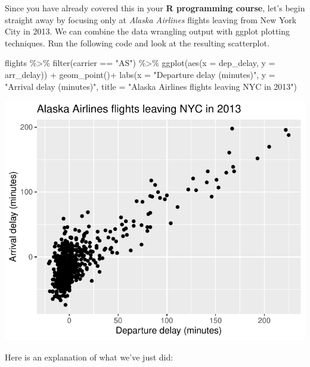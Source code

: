 \documentclass[
  letterpaper,
  DIV=11,
  numbers=noendperiod]{scrartcl}
\newenvironment{Shaded}{\begin{snugshade}}{\end{snugshade}}
\newcommand{\AttributeTok}[1]{\textcolor[rgb]{0.40,0.45,0.13}{#1}}
\newcommand{\FunctionTok}[1]{\textcolor[rgb]{0.28,0.35,0.67}{#1}}
\newcommand{\NormalTok}[1]{\textcolor[rgb]{0.00,0.23,0.31}{#1}}
\newcommand{\SpecialCharTok}[1]{\textcolor[rgb]{0.37,0.37,0.37}{#1}}
\newcommand{\StringTok}[1]{\textcolor[rgb]{0.13,0.47,0.30}{#1}}
\begin{document}
Since you have already covered this in your \textbf{R programming
course}, let's begin straight away by focusing only at \emph{Alaska
Airlines} flights leaving from New York City in 2013. We can combine the
data wrangling output with ggplot plotting techniques. Run the following
code and look at the resulting scatterplot.

\begin{Shaded}
\begin{Highlighting}[]
\NormalTok{flights }\SpecialCharTok{\%\textgreater{}\%}
  \FunctionTok{filter}\NormalTok{(carrier }\SpecialCharTok{==}  \StringTok{"AS"}\NormalTok{) }\SpecialCharTok{\%\textgreater{}\%}
  \FunctionTok{ggplot}\NormalTok{(}\FunctionTok{aes}\NormalTok{(}\AttributeTok{x =}\NormalTok{ dep\_delay, }\AttributeTok{y =}\NormalTok{ arr\_delay)) }\SpecialCharTok{+}
  \FunctionTok{geom\_point}\NormalTok{()}\SpecialCharTok{+}
   \FunctionTok{labs}\NormalTok{(}\AttributeTok{x =} \StringTok{"Departure delay (minutes)"}\NormalTok{, }\AttributeTok{y =} \StringTok{"Arrival delay (minutes)"}\NormalTok{,}
       \AttributeTok{title =} \StringTok{"Alaska Airlines flights leaving NYC in 2013"}\NormalTok{)}
\end{Highlighting}
\end{Shaded}

\begin{center}
\includegraphics{notes_files/figure-pdf/Scatterplot Arrival vs Departue delays-1.pdf}
\end{center}

Here is an explanation of what we've just did:
\end{document}
